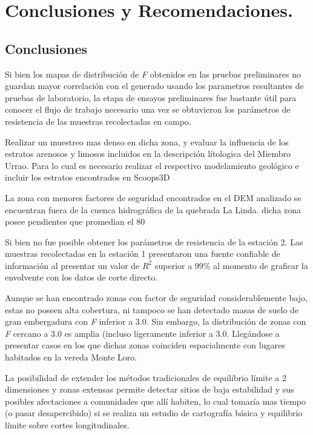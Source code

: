

\chapter{Conclusiones y Recomendaciones.}

\section{Conclusiones}

Si bien los mapas de distribuci\'on de \textit{F} obtenidos en las pruebas preliminares no guardan mayor correlaci\'on con el generado usando los parametros resultantes de pruebas de laboratorio, la etapa de ensayos preliminares fue bastante \'util para conocer el flujo de trabajo necesario una vez se obtuvieron los par\'ametros de resistencia de las muestras recolectadas en campo.

Realizar un muestreo mas denso en dicha zona, y evaluar la influencia de los estratos arenosos y limosos incluidos en la descripci\'on l\'itologica del Miembro Urrao. Para lo cual es necesario realizar el respectivo modelamiento geol\'ogico e incluir los estratos encontrados en Scoops3D

La zona con menores factores de seguridad encontrados en el DEM analizado se encuentran fuera de la cuenca hidrogr\'afica de la quebrada La Linda. dicha zona posee pendientes que promedian el 80%

Si bien no fue posible obtener los par\'ametros de resistencia de la estaci\'on 2. Las muestras recolectadas en la estaci\'on 1 presentaron  una  fuente confiable de informaci\'on al presentar un valor de $R^{2}$ superior a 99\% al momento de graficar la envolvente con los datos de corte directo.

Aunque se han encontrado zonas  con factor de seguridad  considerablemente bajo, estas no poseen alta cobertura, ni tampoco se han detectado masas de suelo de gran embergadura con \textit{F} inferior a 3.0. Sin embargo, la distribuci\'on de zonas con \textit{F} cercano a 3.0  es amplia (incluso ligeramente inferior a 3.0. Lleg\'andose a presentar casos en los que dichas zonas coinciden espacialmente con lugares habitados en la vereda Monte Loro.

La posibilidad de extender los m\'etodos tradicionales de equilibrio l\'imite a 2 dimensiones y zonas extensas permite detectar sitios de baja estabilidad y sus posibles afectaciones a comunidades que all\'i habiten, lo cual tomar\'ia mas tiempo (o pasar desapercibido) si se realiza un estudio de cartograf\'ia b\'asica y equilibrio l\'imite sobre cortes longitudinales.

